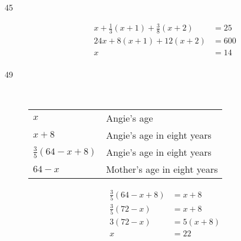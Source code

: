 \documentclass[letterpaper, landscape]{exam}
\begin{document}
\begin{description}

      \item[45]
        \begin{align*}
          x + \frac{1}{3} (x + 1) + \frac{3}{8} (x + 2)            & = 25 \\
          24x + 8(x + 1) + 12(x + 2)                               & = 600 \\
          x                                                        & = \boxed{ 14 } \\
        \end{align*}

      \item[49] \ 

        \begin{tabular}{ll}
          \toprule
          $x$                        & Angie's age \\
          $x + 8$                    & Angie's age in eight years \\
          $\frac{3}{5} (64 - x + 8)$ & Angie's age in eight years \\
          $64 - x$                   & Mother's age in eight years \\
          \bottomrule
        \end{tabular}

      \begin{align*}
        \frac{3}{5}(64 - x + 8)       & = x + 8 \\
        \frac{3}{5} (72 - x)          & = x + 8 \\
        3(72 - x)                     & = 5(x + 8) \\
        x                             & = 22 \\
      \end{align*}


\end{description}
\end{document}
